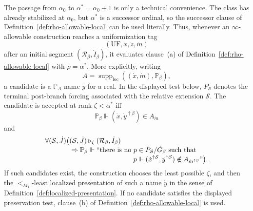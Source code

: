 \documentclass[a4paper,11pt]{article}
\begin{document}
The passage from \(\alpha_0\) to \(\alpha^\ast=\alpha_0+1\) is only a technical
convenience.  The class has already stabilized at \(\alpha_0\), but
\(\alpha^\ast\) is a successor ordinal, so the successor clause of
Definition~\ref{def:rho-allowable-local} can be used literally.  Thus, whenever
an \(\infty\)-allowable construction reaches a uniformization tag
\[
   (\mathrm{UF},\dot x,\dot z,\dot m)
\]
after an initial segment \((\mathcal R_\beta,\dot I_\beta)\), it evaluates
clause~(a) of
Definition~\ref{def:rho-allowable-local} with \(\rho=\alpha^\ast\).  More
explicitly, writing
\[
   A=\operatorname{supp}_{\mathrm{loc}}((\dot x,\dot m),\mathbb P_\beta),
\]
a candidate is a \(\mathbb P_A\)-name \(\dot y\) for a real.  In the displayed
test below, \(P_{\mathcal S}\) denotes the terminal post-branch forcing associated
with the relative extension \(\mathcal S\).  The candidate is accepted at rank
\(\zeta<\alpha^\ast\) iff
\[
   \mathbb P_\beta\Vdash
   (\dot x,\dot y^{\uparrow\beta})\in A_{\dot m}
\]
and
\[
\begin{split}
   \forall (\mathcal S,\dot J)
   \bigl(& (\mathcal S,\dot J)\triangleright_\zeta
            (\mathcal R_\beta,\dot I_\beta) \\[-1mm]
   &\Rightarrow
   \mathbb P_\beta\Vdash
   \text{``there is no }p\in P_{\mathcal S}/\dot G_\beta
   \text{ such that } \\[-1mm]
   &\hspace{33mm}
   p\Vdash
   (\dot x^{\uparrow\mathcal S},\dot y^{\uparrow\mathcal S})
      \notin A_{\dot m^{\uparrow\mathcal S}}\text{''}\bigr).
\end{split}
\]
If such candidates exist, the construction chooses the least possible
\(\zeta\), and then the \(<_{M_1}\)-least localized presentation of such a name
\(\dot y\) in the sense of Definition~\ref{def:localized-presentation}.  If no
candidate satisfies the displayed preservation test, clause~(b) of
Definition~\ref{def:rho-allowable-local} is used.
\end{document}
